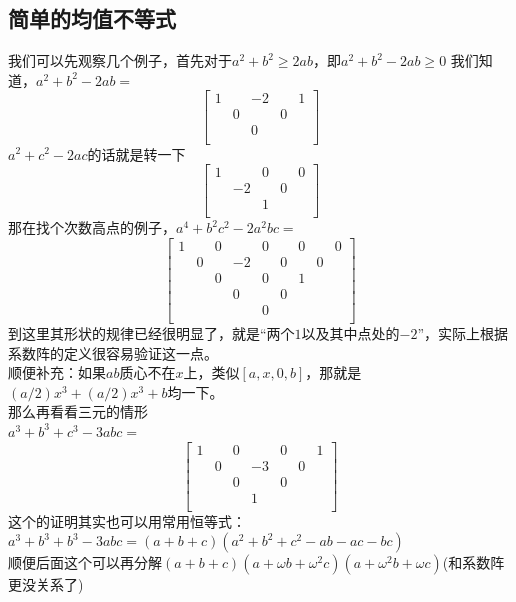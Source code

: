 \documentclass[UTF8]{ctexart}
\begin{document}
\subsection{简单的均值不等式}
我们可以先观察几个例子，首先对于$ a^{2}+b^{2}\geq2ab $，即$ a^{2}+b^{2}-2ab\geq0 $
我们知道，$ a^{2}+b^{2}-2ab= $
\renewcommand*{\arraystretch}{1.732}\[\left[\begin{matrix}
	1& & -2& &1 \\
	& 0& &0 & \\
	& & 0& & \\
\end{matrix}\right]\]
$ a^{2}+c^{2}-2ac $的话就是转一下
\renewcommand*{\arraystretch}{1.732}\[\left[\begin{matrix}
	1& & 0& &0 \\
	& -2& &0 & \\
	& & 1& & \\
\end{matrix}\right]\]
那在找个次数高点的例子，$ a^{4}+b^{2}c^{2}-2a^{2}bc= $
\renewcommand*{\arraystretch}{1.732}\[\left[\begin{matrix}
	1& & 0& &0& & 0& &0\\
    & 0& & -2&&0 & & 0&\\
    & & 0& &0& & 1& &\\
    & & & 0&& 0& & &\\
    & & & &0& & & &\\
\end{matrix}\right]\]
到这里其形状的规律已经很明显了，就是“两个$ 1 $以及其中点处的$ -2 $”，实际上根据系数阵的定义很容易验证这一点。\\
顺便补充：如果$ ab $质心不在$ x $上，类似$[a,x,0,b] $，那就是$ (a/2)x^{3}+(a/2)x^{3}+b $均一下。\\
那么再看看三元的情形\\
$ a^{3}+b^{3}+c^{3}-3abc= $
\renewcommand*{\arraystretch}{1.732}\[\left[\begin{matrix}
	1& & 0& &0& & 1\\
	& 0& & -3& &0 &\\
	& & 0& &0& & \\
	& & & 1& & &\\
\end{matrix}\right]\]
这个的证明其实也可以用常用恒等式：\\
$ a^{3}+b^{3}+b^{3}-3 abc=(a+b+c)(a^{2}+b^{2}+c^{2}-ab-ac-bc) $\\
顺便后面这个可以再分解$ (a+b+c)(a+\omega b+\omega ^{2}c)(a+\omega ^{2} b+\omega c) $(和系数阵更没关系了)\\
\end{document}
